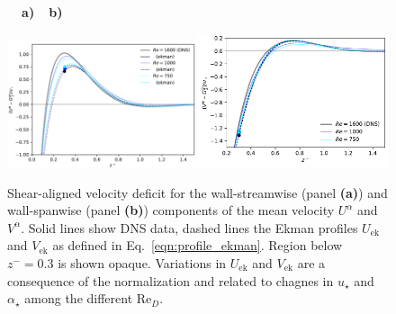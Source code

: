 \documentclass[a4paper,11pt]{amsart}
\newcommand{\RE}{\mathrm{Re}}
\begin{document}
\begin{figure}
  \begin{flushleft}
    \textbf{\ \ a)}\hspace{0.45\textwidth}\textbf{\ \ b)}\\
  \end{flushleft} 
  \includegraphics[width=0.5\textwidth]{../plot/outer_layer_u.pdf}\includegraphics[width=0.5\textwidth]{../plot/outer_layer_w.pdf}
  \caption{
    \label{fig:profiles_outer}
    Shear-aligned velocity deficit for the wall-streamwise (panel \textbf{(a)}) and wall-spanwise (panel \textbf{(b)})
    components of the mean velocity $U^\alpha$ and $V^\alpha$.
    Solid lines show DNS data, dashed lines the Ekman profiles $U_\mathrm{ek}$ and $V_\mathrm{ek}$ as defined in
    Eq.~\ref{eqn:profile_ekman}. Region below $z^-=0.3$ is shown opaque. Variations in $U_\mathrm{ek}$ and $V_\mathrm{ek}$ are
    a consequence of the normalization and related to chagnes in $u_\star$ and $\alpha_\star$ among the different $\RE_D$. 
  }
\end{figure}
\end{document}
